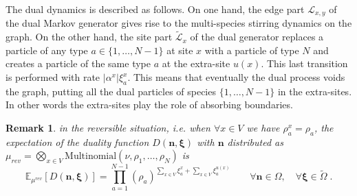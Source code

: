 \documentclass[10pt]{article}
\numberwithin{equation}{section}
\numberwithin{equation}{subsection}
\newtheorem{remark}{Remark}
\newcommand{\dt}{\;.}
\newcommand{\twoj}{\nu}
\begin{document}
The dual dynamics is described as follows. On one hand, the edge part $\mathcal{L}_{x,y}$ of the dual Markov generator gives rise to  the multi-species stirring dynamics on the graph. On the other hand, the site
part $\widetilde{\mathcal{L}}_{x}$ of the dual generator replaces a particle of any type $a\in\{1,\ldots,N-1\}$ at site $x$ with a particle of type $N$ and creates a particle of the same type $a$ at the extra-site $u(x)$. This last transition is performed with rate $|\alpha^{x}|\xi_{a}^{x}$. This means that eventually the dual process voids the graph, putting all the dual particles of species $\{1,\ldots,N-1\}$ in the extra-sites. In other words the extra-sites play the role of absorbing boundaries. 
\begin{remark} in the reversible situation, i.e. when $\forall x\in V$ we have $\rho_{a}^{x}=\rho_{a}$, the expectation  of the duality function  $D(\bm{n},\bm{\xi})$ with   $\bm{n}$ distributed as  $\mu_{rev} = \bigotimes_{x\in V}\text{Multinomial}\left(\twoj, \rho_{1},\ldots,\rho_{N}\right)$ is
\begin{equation}
\mathbb{E}_{\mu^{rev}}\left[D(\bm{n},\bm{\xi})\right]=\prod_{a=1}^{N-1}\left(\rho_{a}\right)^{\sum_{x\in V}\xi_{a}^{x}+\sum_{x\in V}\xi_{a}^{u(x)}}\qquad \forall \bm{n}\in \Omega,\quad\forall \bm{\xi}\in \widetilde{\Omega}\dt
\end{equation}
\end{remark}
%
%
\end{document}
